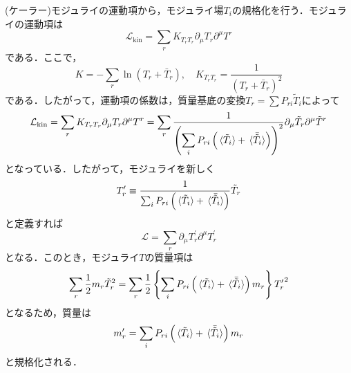 \documentclass[a4paper,uplatex,dvipdfmx]{jsarticle}
\theoremstyle{definition}
\begin{document}
(ケーラー)モジュライの運動項から，モジュライ場$T_{i}$の規格化を行う．モジュライの運動項は
\begin{equation}
   \mathcal{L}_{\text{kin}}
   =
   \sum_{r}
   K_{T_{r}T_{r}}
   \partial_{\mu}T_{r}
   \partial^{\mu}T^{r}
   \nonumber
\end{equation}
である．ここで，
\begin{equation}
   K
   =
   -
   \sum_{r}
   \ln(T_{r}+\bar{T}_{r})
   ,\quad
   K_{T_{r}T_{r}}
   =
   \frac{1}{(T_{r}+\bar{T}_{r})^2}
   \nonumber
\end{equation}
である．したがって，運動項の係数は，質量基底の変換$T_{r}=\sum P_{ri}\tilde{T}_{i}$によって
\begin{equation}
   \mathcal{L}_{\text{kin}}
   =
   \sum_{r}
   K_{T_{r}T_{r}}
   \partial_{\mu}T_{r}
   \partial^{\mu}T^{r}
   =
   \sum_{r}
   \frac{1}{\left(
      \displaystyle
      \sum_{i}P_{ri}\left(\ev*{\tilde{T}_{i}}+\ev*{\bar{\tilde{T}}_{i}}\right)\right)^2
   }   
   \partial_{\mu}\tilde{T}_{r}
   \partial^{\mu}\tilde{T}^{r}
   \nonumber
\end{equation}
となっている．したがって，モジュライを新しく
\begin{equation}
   T^{\prime}_{r}
   \equiv
   \dfrac{1}{\sum_{i}P_{ri}\left(\ev*{\tilde{T}_{i}}+\ev*{\bar{\tilde{T}}_{i}}\right)}\tilde{T}_{r}
   \nonumber
\end{equation}
と定義すれば
\begin{equation}
   \mathcal{L}
   =
   \sum_{r}\partial_{\mu}T^{\prime}_{r}\partial^{\mu}T^{\prime}_{r}
   \nonumber
\end{equation}
となる．このとき，モジュライ$T$の質量項は
\begin{equation}
   \sum_{r}\frac{1}{2}m_{r}\tilde{T}_{r}^2
   =
   \sum_{r}\frac{1}{2}
   \left\{
   \sum_{i}P_{ri}\left(\ev*{\tilde{T}_{i}}+\ev*{\bar{\tilde{T}}_{i}}\right)
   m_{r}
   \right\}
   {T^{\prime}_{r}}^2
   \nonumber
\end{equation}
となるため，質量は
\begin{equation}
   m_{r}^{\prime}
   =   
   \sum_{i}P_{ri}\left(\ev*{\tilde{T}_{i}}+\ev*{\bar{\tilde{T}}_{i}}\right)
   m_{r}
   \label{normalized_mass}
\end{equation}
と規格化される．


\clearpage



\nocite{柴崎_背景_2021}
\nocite{中野_磁化_2023}
\end{document}

